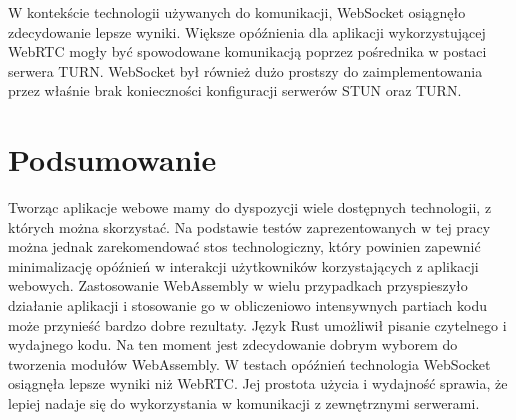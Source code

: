 \documentclass[language=polish,type=master]{aghmodern}
\begin{document}
W kontekście technologii używanych do komunikacji, WebSocket osiągnęło zdecydowanie lepsze wyniki.
Większe opóźnienia dla aplikacji wykorzystującej WebRTC mogły być spowodowane komunikacją poprzez pośrednika w postaci serwera TURN.
WebSocket był również dużo prostszy do zaimplementowania przez właśnie brak konieczności konfiguracji serwerów STUN oraz TURN.

\section{Podsumowanie}
Tworząc aplikacje webowe mamy do dyspozycji wiele dostępnych technologii, z których można skorzystać.
Na podstawie testów zaprezentowanych w tej pracy można jednak zarekomendować stos technologiczny, który powinien zapewnić minimalizację opóźnień w interakcji użytkowników korzystających z aplikacji webowych.
Zastosowanie WebAssembly w wielu przypadkach przyspieszyło działanie aplikacji i stosowanie go w obliczeniowo intensywnych partiach kodu może przynieść bardzo dobre rezultaty.
Język Rust umożliwił pisanie czytelnego i wydajnego kodu.
Na ten moment jest zdecydowanie dobrym wyborem do tworzenia modułów WebAssembly.
W testach opóźnień technologia WebSocket osiągnęła lepsze wyniki niż WebRTC.
Jej prostota użycia i wydajność sprawia, że lepiej nadaje się do wykorzystania w komunikacji z zewnętrznymi serwerami.


\backmatter

\cleardoublepage
\renewcommand\listoflistingscaption{Spis listingów}
\listoflistings

\cleardoublepage
\listoffigures

\cleardoublepage
\printbibliography
\end{document}
